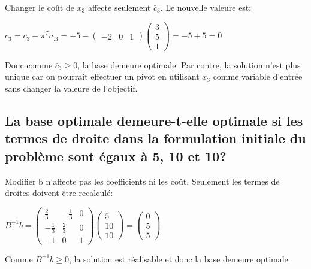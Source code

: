 Changer le coût de $x_3$ affecte seulement $\bar{c}_3$. Le nouvelle valeure est:

\begin{center}
	\begin{math}
	\bar{c}_3 = c_3 - \pi^Ta_{.3} = -5 - 
	\begin{pmatrix}
	-2 & 0 & 1
	\end{pmatrix}
	\begin{pmatrix}
		3 \\
		5 \\
		1
	\end{pmatrix}
	= -5 + 5 = 0
	\end{math}
\end{center}

Donc comme $\bar{c}_3 \geq 0$, la base demeure optimale. Par contre, la solution n’est plus unique car on pourrait effectuer un pivot en utilisant $x_3$ comme variable d’entrée sans changer la valeure de l’objectif.
	
\subsection{La base optimale demeure-t-elle optimale si les termes de droite dans la formulation initiale du problème sont égaux à 5, 10 et 10?}
	
Modifier b n’affecte pas les coefficients ni les coût. Seulement les termes de droites doivent être recalculé:

\begin{center}
	\begin{math}
	B^{-1}b =
	\begin{pmatrix}
		\frac{2}{3}  & -\frac{1}{3} & 0 \\[5pt]
		-\frac{1}{3} & \frac{2}{3}  & 0 \\[5pt]
		-1           & 0            & 1
	\end{pmatrix}
	\begin{pmatrix}
		5  \\[5pt]
		10 \\[5pt]
		10
	\end{pmatrix}
	=
	\begin{pmatrix}
		0 \\[5pt]
		5 \\[5pt]
		5
	\end{pmatrix}
	\end{math}
\end{center}

Comme $B^{-1}b \geq 0$, la solution est réalisable et donc la base demeure optimale.

